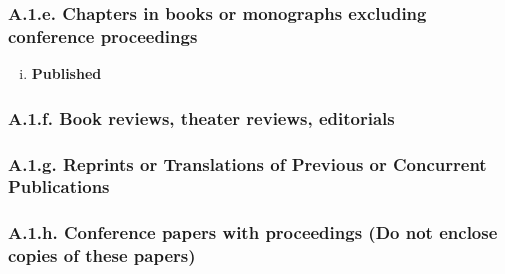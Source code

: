\documentclass[12pt]{article}
\begin{document}
\subsubsection*{A.1.e. Chapters in books or monographs excluding conference proceedings}

\begin{enumerate}[i)]
\item {\bf Published} %
\end{enumerate}

\subsubsection*{A.1.f. Book reviews, theater reviews, editorials}


\subsubsection*{A.1.g. Reprints or Translations of Previous or Concurrent Publications}


\subsubsection*{A.1.h. Conference papers with proceedings (Do not enclose copies of these papers)}

\end{document}
